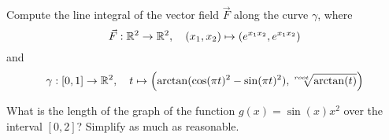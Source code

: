\documentclass[11pt]{article}
\begin{document}
\def\hidesolutions{}

\begin{exercise}
    Compute the line integral of the vector field $\vec{F}$ along the curve $\gamma$, where 
    \[
        \vec F : \mathbb{R}^2 \to \mathbb{R}^2, \quad (x_1,x_2) \mapsto ( e^{ x_1x_2 }, e^{ x_1 x_2 } )
    \]
    and 
    \[
        \gamma : [0,1] \to \mathbb{R}^2, \quad t \mapsto \left( \arctan( \cos(\pi t)^2 - \sin(\pi t)^2 ), \sqrt[root]{\arctan(t)} \right)
    \]
\end{exercise}
\begin{solution}
\end{solution}

\begin{exercise}
    What is the length of the graph of the function $g(x) = \sin(x) x^2$ over the interval $[0,2]$?
    Simplify as much as reasonable.
\end{exercise}
\begin{solution}
\end{solution}

\begin{exercise}
\end{exercise}
\begin{solution}     
\end{solution}
\end{document}
